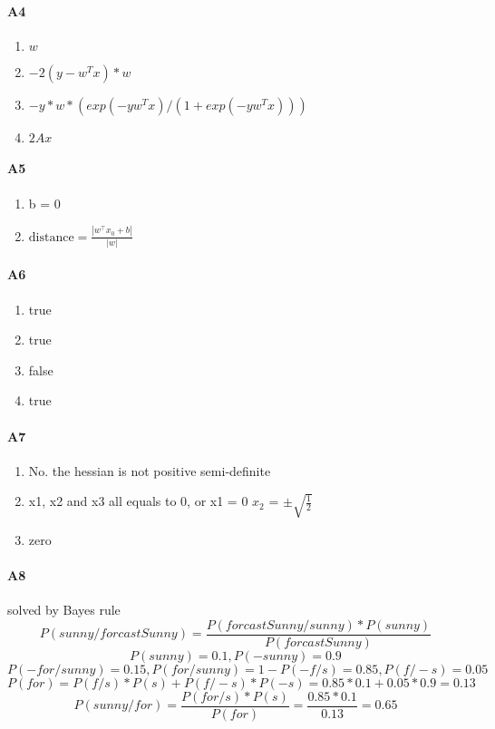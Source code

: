 \documentclass[11pt]{article}
\begin{document}
\paragraph{A4} 
\begin{enumerate} 
    \item $w$
    \item $-2(y - w^T x) * w$
    \item $ -y * w * ( exp(-yw^T x) / (1 + exp(-yw^T x)) )$
    \item $2Ax$
\end{enumerate}

\paragraph{A5}
\begin{enumerate}
    \item b = 0
    \item $\text{distance} = \frac{|w^\intercal x_0 + b|}{\left|w\right|}$
\end{enumerate}

\paragraph{A6} 
\begin{enumerate}
    \item true
    \item true
    \item false
    \item true
\end{enumerate}

\paragraph{A7} 
\begin{enumerate}
    \item No. the hessian is not positive semi-definite
    \item x1, x2 and x3 all equals to 0, or x1 = 0 $x_2$ = $\pm \sqrt{\frac{1}{2}}$
    \item zero
\end{enumerate}

\paragraph{A8}

solved by Bayes rule
$$ P(sunny/forcastSunny) = \frac{P(forcastSunny/sunny) * P(sunny)}{P(forcastSunny)} $$
$$ P(sunny) = 0.1, P(-sunny) = 0.9$$
$$P(-for/sunny) = 0.15, P(for/sunny) = 1 - P(-f/s) = 0.85, P(f/-s) = 0.05$$
$$P(for) = P(f/s) * P(s) + P(f/-s) * P(-s) = 0.85 * 0.1 + 0.05 * 0.9 = 0.13$$
$$P(sunny/for) = \frac{P(for/s) * P(s)}{P(for)} = \frac{0.85 * 0.1}{0.13} = 0.65$$
\end{document}

